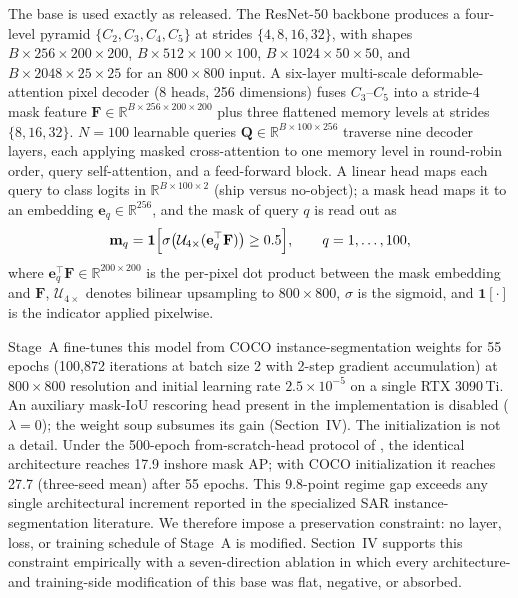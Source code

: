 The base is used exactly as released. The ResNet-50 backbone produces a four-level pyramid $\{C_2,C_3,C_4,C_5\}$ at strides $\{4,8,16,32\}$, with shapes $B\times 256\times 200\times 200$, $B\times 512\times 100\times 100$, $B\times 1024\times 50\times 50$, and $B\times 2048\times 25\times 25$ for an $800\times 800$ input. A six-layer multi-scale deformable-attention pixel decoder (8 heads, 256 dimensions) fuses $C_3$--$C_5$ into a stride-4 mask feature $\mathbf{F}\in\mathbb{R}^{B\times 256\times 200\times 200}$ plus three flattened memory levels at strides $\{8,16,32\}$. $N=100$ learnable queries $\mathbf{Q}\in\mathbb{R}^{B\times 100\times 256}$ traverse nine decoder layers, each applying masked cross-attention to one memory level in round-robin order, query self-attention, and a feed-forward block. A linear head maps each query to class logits in $\mathbb{R}^{B\times 100\times 2}$ (ship versus no-object); a mask head maps it to an embedding $\mathbf{e}_q\in\mathbb{R}^{256}$, and the mask of query $q$ is read out as
\begin{equation}\label{eq:readout}
\mathbf{m}_q=\mathbf{1}\Bigl[\sigma\bigl(\mathcal{U}_{4\times}(\mathbf{e}_q^{\top}\mathbf{F})\bigr)\ge 0.5\Bigr],
\qquad q=1,\dots,100,
\end{equation}
where $\mathbf{e}_q^{\top}\mathbf{F}\in\mathbb{R}^{200\times 200}$ is the per-pixel dot product between the mask embedding and $\mathbf{F}$, $\mathcal{U}_{4\times}$ denotes bilinear upsampling to $800\times 800$, $\sigma$ is the sigmoid, and $\mathbf{1}[\cdot]$ is the indicator applied pixelwise.

Stage~A fine-tunes this model from COCO instance-segmentation weights for 55 epochs (100{,}872 iterations at batch size 2 with 2-step gradient accumulation) at $800\times 800$ resolution and initial learning rate $2.5\times 10^{-5}$ on a single RTX 3090\,Ti. An auxiliary mask-IoU rescoring head present in the implementation is disabled ($\lambda=0$); the weight soup subsumes its gain (Section~IV). The initialization is not a detail. Under the 500-epoch from-scratch-head protocol of \cite{o2former2025}, the identical architecture reaches 17.9 inshore mask AP; with COCO initialization it reaches 27.7 (three-seed mean) after 55 epochs. This 9.8-point regime gap exceeds any single architectural increment reported in the specialized SAR instance-segmentation literature. We therefore impose a preservation constraint: no layer, loss, or training schedule of Stage~A is modified. Section~IV supports this constraint empirically with a seven-direction ablation in which every architecture- and training-side modification of this base was flat, negative, or absorbed.

